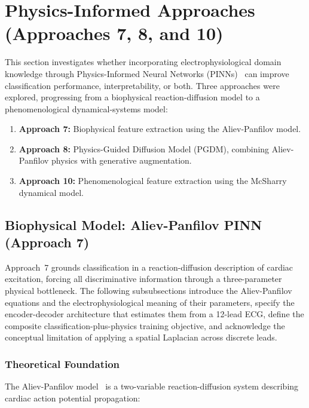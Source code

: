 
\section{Physics-Informed Approaches (Approaches 7, 8, and 10)}
\label{sec:pinn}

This section investigates whether incorporating electrophysiological domain knowledge through Physics-Informed Neural Networks (PINNs)~\cite{raissi2019physics} can improve classification performance, interpretability, or both. Three approaches were explored, progressing from a biophysical reaction-diffusion model to a phenomenological dynamical-systems model:

\begin{enumerate}
    \item \textbf{Approach 7:} Biophysical feature extraction using the Aliev-Panfilov model.
    \item \textbf{Approach 8:} Physics-Guided Diffusion Model (PGDM), combining Aliev-Panfilov physics with generative augmentation.
    \item \textbf{Approach 10:} Phenomenological feature extraction using the McSharry dynamical model.
\end{enumerate}

\subsection{Biophysical Model: Aliev-Panfilov PINN (Approach 7)}
\label{sec:aliev_panfilov}

Approach~7 grounds classification in a reaction-diffusion description of cardiac excitation, forcing all discriminative information through a three-parameter physical bottleneck. The following subsubsections introduce the Aliev-Panfilov equations and the electrophysiological meaning of their parameters, specify the encoder-decoder architecture that estimates them from a 12-lead ECG, define the composite classification-plus-physics training objective, and acknowledge the conceptual limitation of applying a spatial Laplacian across discrete leads.

\subsubsection{Theoretical Foundation}

The Aliev-Panfilov model~\cite{aliev1996simple} is a two-variable reaction-diffusion system describing cardiac action potential propagation:

